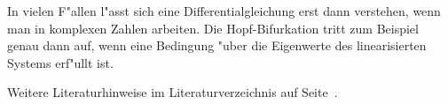 In vielen F"allen l"asst sich eine Differentialgleichung erst dann
verstehen, wenn man in komplexen Zahlen arbeiten. 
Die Hopf-Bifurkation tritt zum Beispiel genau dann auf, wenn eine
Bedingung "uber die Eigenwerte des linearisierten Systems erf"ullt ist.

Weitere Literaturhinweise im Literaturverzeichnis auf
Seite~\pageref{skript:literatur}.

